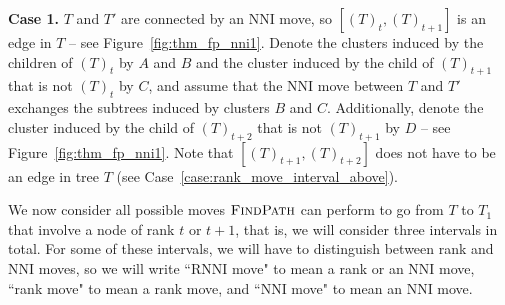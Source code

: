 \documentclass[11pt]{amsart}
\newcommand{\rnni}{\mathrm{RNNI}}
\newcommand{\findpath}{\textsc{FindPath}}
\newcommand{\nni}{\mathrm{NNI}}
\begin{document}
\textbf{Case 1.}
$T$ and $T'$ are connected by an $\nni$ move, so $[(T)_t,(T)_{t+1}]$ is an edge in $T$ -- see Figure~\ref{fig:thm_fp_nni1}.
Denote the clusters induced by the children of $(T)_t$ by $A$ and $B$ and the cluster induced by the child of $(T)_{t+1}$ that is not $(T)_t$ by $C$, and assume that the $\nni$ move between $T$ and $T'$ exchanges the subtrees induced by clusters $B$ and $C$.
Additionally, denote the cluster induced by the child of $(T)_{t+2}$ that is not $(T)_{t+1}$ by $D$ -- see Figure~\ref{fig:thm_fp_nni1}.
Note that $[(T)_{t+1}, (T)_{t+2}]$ does not have to be an edge in tree $T$ (see Case~\ref{case:rank_move_interval_above}).

We now consider all possible moves $\findpath$ can perform to go from $T$ to $T_1$ that involve a node of rank $t$ or $t+1$, that is, we will consider three intervals in total.
For some of these intervals, we will have to distinguish between rank and $\nni$ moves, so we will write ``$\rnni$ move" to mean a rank or an $\nni$ move, ``rank move" to mean a rank move, and ``$\nni$ move" to mean an $\nni$ move.
\end{document}
